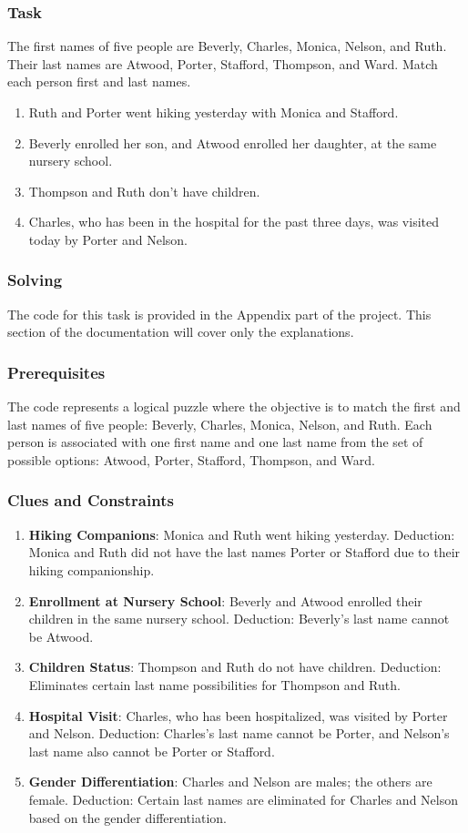 \documentclass[a4paper,12pt]{report}
\begin{document}
\subsubsection{\Large Task}
The first names of five people are Beverly, Charles, Monica, Nelson, and Ruth. Their last names are Atwood, Porter, Stafford, Thompson, and Ward. Match each person first and last names.

\begin{enumerate}
    \item Ruth and Porter went hiking yesterday with Monica and Stafford.
    \item Beverly enrolled her son, and Atwood enrolled her daughter, at the same nursery school.
    \item Thompson and Ruth don't have children.
    \item Charles, who has been in the hospital for the past three days, was visited today by Porter and Nelson.
\end{enumerate}

\subsubsection{\Large Solving}
The code for this task is provided in the Appendix part of the project. This section of the documentation will cover only the explanations. 
\subsubsection{Prerequisites}
The code represents a logical puzzle where the objective is to match the first and last names of five people: Beverly, Charles, Monica, Nelson, and Ruth. Each person is associated with one first name and one last name from the set of possible options: Atwood, Porter, Stafford, Thompson, and Ward.

\subsubsection{Clues and Constraints}
\begin{enumerate}
\item  \textbf{Hiking Companions}: Monica and Ruth went hiking yesterday. Deduction: Monica and Ruth did not have the last names Porter or Stafford due to their hiking companionship.
\item \textbf{Enrollment at Nursery School}: Beverly and Atwood enrolled their children in the same nursery school. Deduction: Beverly's last name cannot be Atwood.
\item  \textbf{Children Status}: Thompson and Ruth do not have children. Deduction: Eliminates certain last name possibilities for Thompson and Ruth.
\item \textbf{Hospital Visit}: Charles, who has been hospitalized, was visited by Porter and Nelson. Deduction: Charles's last name cannot be Porter, and Nelson's last name also cannot be Porter or Stafford.
\item \textbf{Gender Differentiation}: Charles and Nelson are males; the others are female. Deduction: Certain last names are eliminated for Charles and Nelson based on the gender differentiation.
\end{enumerate}
\end{document}
